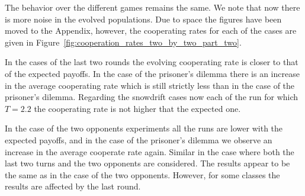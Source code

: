 \documentclass[11pt]{article}
\theoremstyle{plainCl1}
\theoremstyle{plainCl2}
\begin{document}
The behavior over the different games remains the same. We note that now there
is more noise in the evolved populations. Due to space the figures have been
moved to the Appendix, however, the cooperating rates for each of the cases are
given in Figure~\ref{fig:cooperation_rates_two_by_two_part_two}.

In the cases of the last two rounds the evolving cooperating rate is closer
to that of the expected payoffs. In the case of the prisoner's dilemma there
is an increase in the average cooperating rate which is still strictly less
than in the case of the prisoner's dilemma. Regarding the snowdrift cases
now each of the run for which \(T = 2.2\) the cooperating rate is not higher
that the expected one.

In the case of the two opponents experiments all the runs are lower with the
expected payoffs, and in the case of the prisoner's dilemma we observe an
increase in the average cooperate rate again. Similar in the case where both
the last two turns and the two opponents are considered. The results appear
to be the same as in the case of the two opponents. However, for some classes
the results are affected by the last round.
\end{document}
